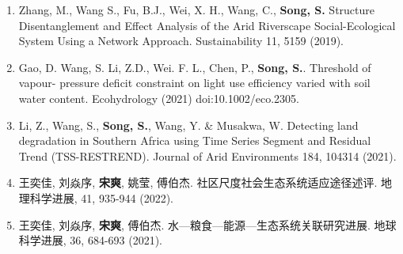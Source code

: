 \begin{paper}
\begin{enumerate}
	\item Zhang, M., Wang S., Fu, B.J., Wei, X. H., Wang, C., \textbf{Song, S.} Structure Disentanglement and Effect Analysis of the Arid Riverscape Social-Ecological System Using a Network Approach. Sustainability 11, 5159 (2019). %
	\item Gao, D. Wang, S. Li, Z.D., Wei. F. L., Chen, P., \textbf{Song, S.}. Threshold of vapour- pressure deficit constraint on light use efficiency varied with soil water content. Ecohydrology (2021) doi:10.1002/eco.2305. %
	\item Li, Z., Wang, S., \textbf{Song, S.}, Wang, Y. \& Musakwa, W. Detecting land degradation in Southern Africa using Time Series Segment and Residual Trend (TSS-RESTREND). Journal of Arid Environments 184, 104314 (2021). %
	\item 王奕佳, 刘焱序, \textbf{宋爽}, 姚莹, 傅伯杰. 社区尺度社会\textendash{}生态系统适应途径述评. 地理科学进展, 41, 935-944 (2022). %
	\item 王奕佳, 刘焱序, \textbf{宋爽}, 傅伯杰. 水—粮食—能源—生态系统关联研究进展. 地球科学进展, 36, 684-693 (2021). %
	
\end{enumerate}
\end{paper}
